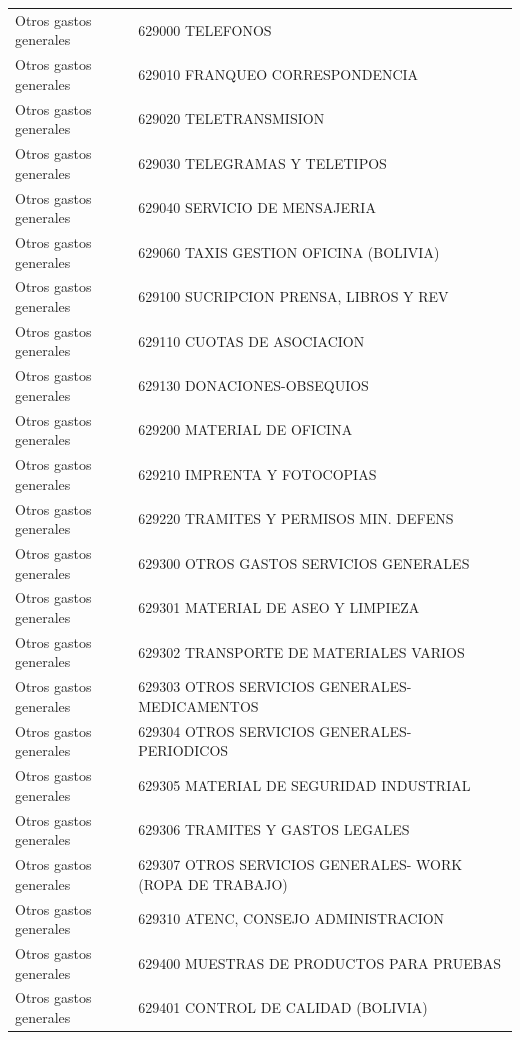 \documentclass[11pt,letterpaper]{article}
\begin{document}
\begin{xltabular}{\textwidth}{L{5.2cm} Y}
 Otros gastos generales & 629000 TELEFONOS \\
Otros gastos generales & 629010 FRANQUEO CORRESPONDENCIA \\
 Otros gastos generales & 629020 TELETRANSMISION \\
Otros gastos generales & 629030 TELEGRAMAS Y TELETIPOS \\
 Otros gastos generales & 629040 SERVICIO DE MENSAJERIA \\
Otros gastos generales & 629060 TAXIS GESTION OFICINA (BOLIVIA) \\
 Otros gastos generales & 629100 SUCRIPCION PRENSA, LIBROS Y REV \\
Otros gastos generales & 629110 CUOTAS DE ASOCIACION \\
 Otros gastos generales & 629130 DONACIONES-OBSEQUIOS \\
Otros gastos generales & 629200 MATERIAL DE OFICINA \\
 Otros gastos generales & 629210 IMPRENTA Y FOTOCOPIAS \\
Otros gastos generales & 629220 TRAMITES Y PERMISOS MIN. DEFENS \\
 Otros gastos generales & 629300 OTROS GASTOS SERVICIOS GENERALES \\
Otros gastos generales & 629301 MATERIAL DE ASEO Y LIMPIEZA \\
 Otros gastos generales & 629302 TRANSPORTE DE MATERIALES VARIOS \\
Otros gastos generales & 629303 OTROS SERVICIOS GENERALES- MEDICAMENTOS \\
 Otros gastos generales & 629304 OTROS SERVICIOS GENERALES- PERIODICOS \\
Otros gastos generales & 629305 MATERIAL DE SEGURIDAD INDUSTRIAL \\
 Otros gastos generales & 629306 TRAMITES Y GASTOS LEGALES \\
Otros gastos generales & 629307 OTROS SERVICIOS GENERALES- WORK (ROPA DE TRABAJO) \\
 Otros gastos generales & 629310 ATENC, CONSEJO ADMINISTRACION \\
Otros gastos generales & 629400 MUESTRAS DE PRODUCTOS PARA PRUEBAS \\
 Otros gastos generales & 629401 CONTROL DE CALIDAD (BOLIVIA) \\

\end{xltabular}
\end{document}
